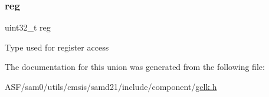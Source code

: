 \subsubsection{\texorpdfstring{reg}{reg}}
{\footnotesize\ttfamily uint32\+\_\+t reg}

Type used for register access 

The documentation for this union was generated from the following file\+:\begin{DoxyCompactItemize}
\item 
A\+S\+F/sam0/utils/cmsis/samd21/include/component/\mbox{\hyperlink{utils_2cmsis_2samd21_2include_2component_2gclk_8h}{gclk.\+h}}\end{DoxyCompactItemize}
